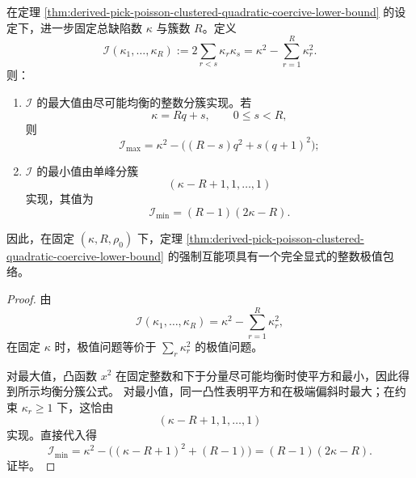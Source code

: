\begin{corollary}[固定总缺陷数与簇数下的强制互能整数极值]\label{cor:derived-pick-poisson-clustered-forced-interaction-extrema}
在定理 \ref{thm:derived-pick-poisson-clustered-quadratic-coercive-lower-bound} 的设定下，进一步固定总缺陷数 \(\kappa\) 与簇数 \(R\)。定义
\[
\mathcal I(\kappa_1,\dots,\kappa_R)
:=
2\sum_{r<s}\kappa_r\kappa_s
=
\kappa^2-\sum_{r=1}^{R}\kappa_r^2.
\]
则：
\begin{enumerate}
  \item \(\mathcal I\) 的最大值由尽可能均衡的整数分簇实现。若
  \[
  \kappa=Rq+s,
  \qquad
  0\le s<R,
  \]
  则
  \[
  \mathcal I_{\max}
  =
  \kappa^2-\bigl((R-s)q^2+s(q+1)^2\bigr);
  \]
  \item \(\mathcal I\) 的最小值由单峰分簇
  \[
  (\kappa-R+1,1,\dots,1)
  \]
  实现，其值为
  \[
  \mathcal I_{\min}=(R-1)(2\kappa-R).
  \]
\end{enumerate}
因此，在固定 \((\kappa,R,\rho_0)\) 下，定理 \ref{thm:derived-pick-poisson-clustered-quadratic-coercive-lower-bound} 的强制互能项具有一个完全显式的整数极值包络。
\end{corollary}
\begin{proof}
由
\[
\mathcal I(\kappa_1,\dots,\kappa_R)=\kappa^2-\sum_{r=1}^{R}\kappa_r^2,
\]
在固定 \(\kappa\) 时，极值问题等价于 \(\sum_r\kappa_r^2\) 的极值问题。

对最大值，凸函数 \(x^2\) 在固定整数和下于分量尽可能均衡时使平方和最小，因此得到所示均衡分簇公式。
对最小值，同一凸性表明平方和在极端偏斜时最大；在约束 \(\kappa_r\ge 1\) 下，这恰由
\[
(\kappa-R+1,1,\dots,1)
\]
实现。直接代入得
\[
\mathcal I_{\min}
=
\kappa^2-\bigl((\kappa-R+1)^2+(R-1)\bigr)
=(R-1)(2\kappa-R).
\]
证毕。
\end{proof}

